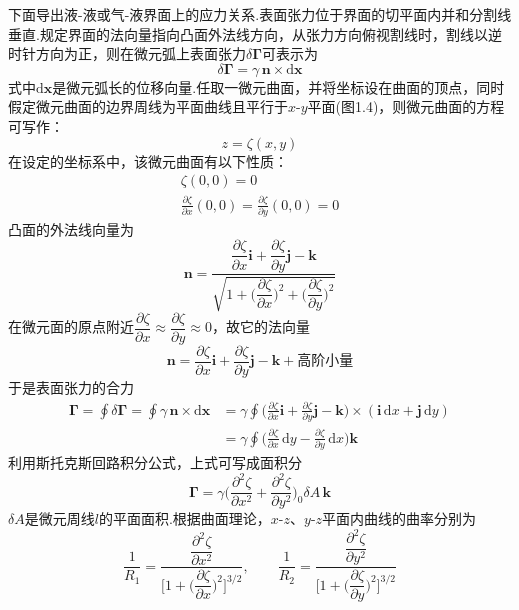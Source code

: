 下面导出液-液或气-液界面上的应力关系.表面张力位于界面的切平面内并和分割线垂直.规定界面的法向量指向凸面外法线方向，从张力方向俯视割线时，割线以逆时针方向为正，则在微元弧上表面张力$\delta\boldsymbol{\Gamma}$可表示为
\begin{equation*}
\delta\boldsymbol{\Gamma}=\gamma\,\boldsymbol{n}\times\mathrm{d}\boldsymbol{x}
\tag{1.35}
\end{equation*}
式中$\mathrm{d}\boldsymbol{x}$是微元弧长的位移向量.任取一微元曲面，并将坐标设在曲面的顶点，同时假定微元曲面的边界周线为平面曲线且平行于$x\text{-}y$平面(图1.4)，则微元曲面的方程可写作：
\begin{equation*}
z=\zeta(x,y)
\tag{1.36}
\end{equation*}
在设定的坐标系中，该微元曲面有以下性质：
\begin{gather*}
\zeta(0,0)=0\tag{1.37}\\[2pt]
\frac{\partial\zeta}{\partial x}(0,0)=\frac{\partial\zeta}{\partial y}(0,0)=0\tag{1.38}
\end{gather*}
凸面的外法线向量为
\[
\boldsymbol{n}=\frac{\dfrac{\partial\zeta}{\partial x}\boldsymbol{i}+\dfrac{\partial\zeta}{\partial y}\boldsymbol{j}-\boldsymbol{k}}{\sqrt{1+\Big(\dfrac{\partial\zeta}{\partial x}\Big)^{2}+\Big(\dfrac{\partial\zeta}{\partial y}\Big)^{2}}}
\]
在微元面的原点附近$\dfrac{\partial\zeta}{\partial x}\approx\dfrac{\partial\zeta}{\partial y}\approx 0$，故它的法向量
\[
\boldsymbol{n}=\frac{\partial\zeta}{\partial x}\boldsymbol{i}+\frac{\partial\zeta}{\partial y}\boldsymbol{j}-\boldsymbol{k}+\text{高阶小量}
\]
于是表面张力的合力
\begin{align*}
\boldsymbol{\Gamma}=\oint\delta\boldsymbol{\Gamma}=\oint\gamma\,\boldsymbol{n}\times\mathrm{d}\boldsymbol{x}
&=\gamma\oint\Big(\frac{\partial\zeta}{\partial x}\boldsymbol{i}+\frac{\partial\zeta}{\partial y}\boldsymbol{j}-\boldsymbol{k}\Big)\times(\boldsymbol{i}\,\mathrm{d}x+\boldsymbol{j}\,\mathrm{d}y)\\[2pt]
&=\gamma\oint\Big(\frac{\partial\zeta}{\partial x}\,\mathrm{d}y-\frac{\partial\zeta}{\partial y}\,\mathrm{d}x\Big)\boldsymbol{k}
\end{align*}
利用斯托克斯回路积分公式，上式可写成面积分
\begin{equation*}
\boldsymbol{\Gamma}=\gamma\Big(\frac{\partial^{2}\zeta}{\partial x^{2}}+\frac{\partial^{2}\zeta}{\partial y^{2}}\Big)_{\!0}\delta A\,\boldsymbol{k}
\tag{1.39}
\end{equation*}
$\delta A$是微元周线$l$的平面面积.根据曲面理论，$x\text{-}z$、$y\text{-}z$平面内曲线的曲率分别为
\[
\frac{1}{R_1}=\frac{\dfrac{\partial^{2}\zeta}{\partial x^{2}}}{\Big[1+\Big(\dfrac{\partial\zeta}{\partial x}\Big)^{2}\Big]^{3/2}},\qquad
\frac{1}{R_2}=\frac{\dfrac{\partial^{2}\zeta}{\partial y^{2}}}{\Big[1+\Big(\dfrac{\partial\zeta}{\partial y}\Big)^{2}\Big]^{3/2}}
\]
